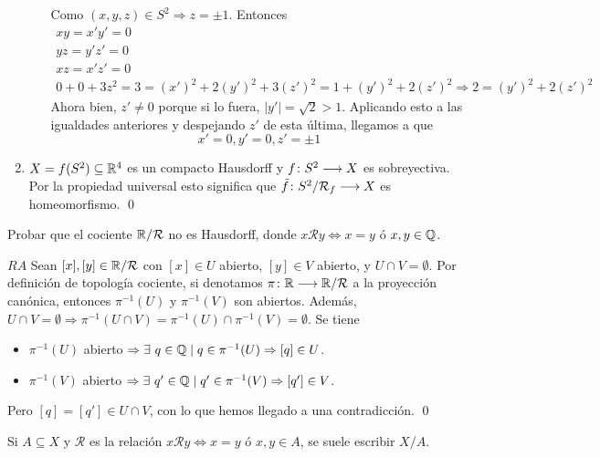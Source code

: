 \documentclass[GTS.tex]{subfiles}
\begin{document}
\begin{ejer}
\begin{solucion}
\begin{enumerate}
\begin{itemize}
Como $(x,y,z)\in S^2\Rightarrow z=\pm 1$. Entonces
\begin{gather*}
xy=x'y'=0\\
yz=y'z'=0\\
xz=x'z'=0\\
0+0+3z^2=3=(x')^2+2(y')^2+3(z')^2=1+(y')^2+2(z')^2\Rightarrow 2=(y')^2+2(z')^2
\end{gather*}
Ahora bien, $z'\neq 0$ porque si lo fuera, $|y'|=\sqrt{2}>1$. Aplicando esto a las igualdades anteriores y despejando $z'$ de esta última, llegamos a que
\[
x'=0, y'=0, z'=\pm 1
\]
\end{itemize}
\item $X=f(S^2)\subseteq\mathbb{R}^4$ es un compacto Hausdorff y $f\colon{S^2}\longrightarrow{X}$ es sobreyectiva. Por la propiedad universal esto significa que $\tilde{f}\colon{S^2/\mathcal{R}_f}\longrightarrow{X}$ es homeomorfismo. \qed
\end{enumerate}
\end{solucion}
\end{ejer}

\begin{ejer} Probar que el cociente $\mathbb{R}/\mathcal{R}$ no es Hausdorff, donde $x\mathcal{R}y\Leftrightarrow x=y$ ó $x,y\in\mathbb{Q}$.
\begin{solucion}
$\boxed{RA}$ Sean $[x],[y]\in\mathbb{R}/\mathcal{R}$ con $[x]\in U$ abierto, $[y]\in V$ abierto, y $U\cap V=\emptyset$. Por definición de topología cociente, si denotamos $\pi\colon{\mathbb{R}}\longrightarrow{\mathbb{R}/\mathcal{R}}$ a la proyección canónica, entonces $\pi^{-1}(U)$ y $\pi^{-1}(V)$ son abiertos. Además, $U\cap V=\emptyset\Rightarrow \pi^{-1}(U\cap V)=\pi^{-1}(U)\cap\pi^{-1}(V)=\emptyset$. Se tiene
\begin{itemize}
\item $\pi^{-1}(U)$ abierto $\Rightarrow \exists\ q\in\mathbb{Q}\mid q\in\pi^{-1}(U)\Rightarrow [q]\in U$.
\item $\pi^{-1}(V)$ abierto $\Rightarrow \exists\ q'\in\mathbb{Q}\mid q'\in\pi^{-1}(V)\Rightarrow [q']\in V$.
\end{itemize}
Pero $[q]=[q']\in U\cap V$, con lo que hemos llegado a una contradicción. \qed
\end{solucion}
\end{ejer}

\vspace{0.2cm}

\begin{nota} Si $A\subseteq X$ y $\mathcal{R}$ es la relación $x\mathcal{R}y\Leftrightarrow x=y$ ó $x,y\in A$, se suele escribir $X/A$.
\end{nota}
\end{document}
